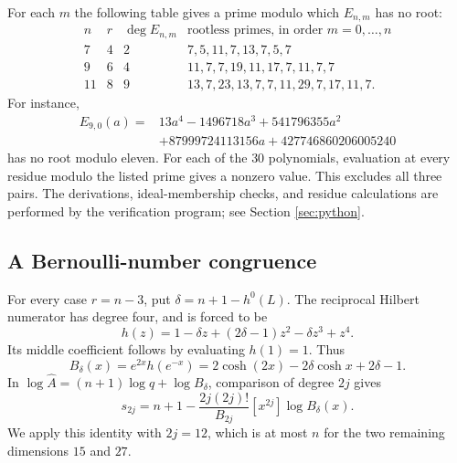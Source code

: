 \documentclass[11pt,reqno,letterpaper]{amsart}
\newcommand{\Ahat}{\widehat A}
\theoremstyle{definition}
\numberwithin{equation}{section}
\begin{document}
For each $m$ the following table gives a prime modulo which $E_{n,m}$
has no root:
\[
\begin{array}{c|c|c|l}
 n&r&\deg E_{n,m}&\text{rootless primes, in order }m=0,\ldots,n\\ \hline
7&4&2&7,5,11,7,13,7,5,7\\
9&6&4&11,7,7,19,11,17,7,11,7,7\\
11&8&9&13,7,23,13,7,7,11,29,7,17,11,7.
\end{array}
\]
For instance,
\[
\begin{aligned}
 E_{9,0}(a)={}&13a^4-1496718a^3+541796355a^2\\
             &+87999724113156a+427746860206005240
\end{aligned}
\]
has no root modulo eleven.
For each of the $30$ polynomials, evaluation at every residue modulo
the listed prime gives a nonzero value. This excludes all three pairs.
The derivations, ideal-membership checks, and residue calculations
are performed by the verification program; see Section \ref{sec:python}.

\subsection{A Bernoulli-number congruence}
For every case $r=n-3$, put $\delta=n+1-h^0(L)$.
The reciprocal Hilbert numerator has degree four, and is forced to be
\begin{equation}\label{eq:hfour}
 h(z)=1-\delta z+(2\delta-1)z^2-\delta z^3+z^4.
\end{equation}
Its middle coefficient follows by evaluating $h(1)=1$.
Thus
\[
 B_\delta(x)=e^{2x}h(e^{-x})
 =2\cosh(2x)-2\delta\cosh x+2\delta-1.
\]
In $\log\Ahat=(n+1)\log q+\log B_\delta$, comparison of degree $2j$ gives
\begin{equation}\label{eq:powerBernoulli}
 s_{2j}=n+1-\frac{2j(2j)!}{B_{2j}}[x^{2j}]\log B_\delta(x).
\end{equation}
We apply this identity with $2j=12$, which is at most $n$ for the two
remaining dimensions $15$ and $27$.
\end{document}
